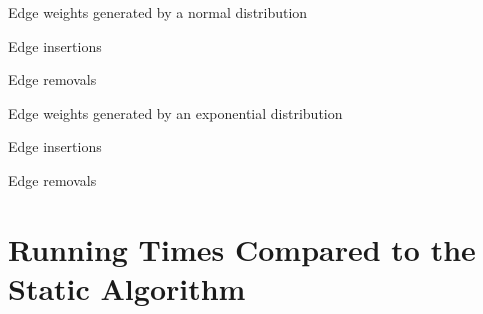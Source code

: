 \begin{table}[H]
\centering\footnotesize
\setlength{\tabcolsep}{2pt}
\label{tab:dyn-mwm:speedup-hyp}

\begin{subtable}[t]{\textwidth}
\centering
\caption{Edge weights generated by a normal distribution}
\begin{subtable}[t]{.5\textwidth}
\centering
Edge insertions


\end{subtable}\hfill
\begin{subtable}[t]{.5\textwidth}
\centering
Edge removals


\end{subtable}
\end{subtable}\bigskip

\begin{subtable}[t]{\textwidth}
\centering
\caption{Edge weights generated by an exponential distribution}
\begin{subtable}[t]{.5\textwidth}
\centering
Edge insertions


\end{subtable}\hfill
\begin{subtable}[t]{.5\textwidth}
\centering
Edge removals


\end{subtable}
\end{subtable}
\end{table}


\section{Running Times Compared to the Static Algorithm}
\label{apx:dyn-mwm:running-times}

